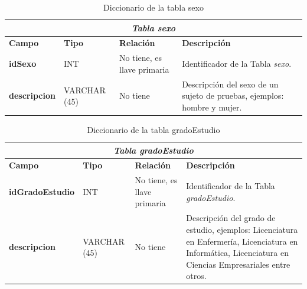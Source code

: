 \begin{table}[H]
\begin{center}
\begin{tabular}{||p{4cm}|p{}|p{}|p{5cm}||}
\hline
\multicolumn{4}{||c||}{\textit{\textbf{Tabla sexo}}}\\
\hline 
\cellcolor{lightgray}\textbf{Campo} & \cellcolor{lightgray}\textbf{Tipo} & \cellcolor{lightgray}\textbf{Relación} & \cellcolor{lightgray}\textbf{Descripción} \\ \hline 
\textbf{idSexo} & {INT} & {No tiene, es llave primaria} & {Identificador de la Tabla \textit{sexo}.} \\ \hline
\textbf{descripcion} & {VARCHAR (45)} & {No tiene} & {Descripción del sexo de un sujeto de pruebas, ejemplos: hombre y mujer.} \\ \hline
\end{tabular}
\caption{Diccionario de la tabla sexo}
\label{Tabla:sexo}
\end{center}
\end{table}

\begin{table}[H]
\begin{center}
\begin{tabular}{||p{4cm}|p{}|p{}|p{5cm}||}
\hline
\multicolumn{4}{||c||}{\textit{\textbf{Tabla gradoEstudio}}}\\
\hline 
\cellcolor{lightgray}\textbf{Campo} & \cellcolor{lightgray}\textbf{Tipo} & \cellcolor{lightgray}\textbf{Relación} & \cellcolor{lightgray}\textbf{Descripción} \\ \hline 
\textbf{idGradoEstudio} & {INT} & {No tiene, es llave primaria}& {Identificador de la Tabla \textit{gradoEstudio}.} \\ \hline
\textbf{descripcion}  & {VARCHAR (45)} & {No tiene}& {Descripción del grado de estudio, ejemplos: Licenciatura en Enfermería, Licenciatura en Informática, Licenciatura en Ciencias Empresariales entre otros.} \\ \hline
\end{tabular}
\caption{Diccionario de la tabla gradoEstudio}
\label{Tabla:gradoEstudio}
\end{center}
\end{table}

